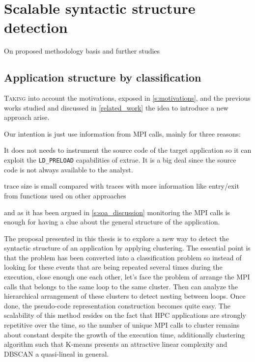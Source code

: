 
\chapter{Scalable syntactic structure detection}

On proposed methodology basis and further studies

\section{Application structure by
classification}\label{s:app_structire_by_classification}

\lettrine{T}{aking} into account the motivations, exposed in \ref{s:motivations}, and the
previous works studied and discussed in \ref{related_work} the idea to introduce
a new approach arise.
 
Our intention is just use information from MPI calls, mainly for 
three reasons:
\begin{enumerate*}[label=\roman*)]
  \item It does not needs to instrument the source code of the target
    application so it can exploit the \texttt{LD\_PRELOAD} capabilities of extrae.
    It is a big deal since the source code is not always available to the
    analyst.
  \item trace size is small compared with traces with more information
    like entry/exit from functions used on other approaches
  \item and as it has been argued in \ref{s:soa_discussion} monitoring the MPI 
    calls is enough for having a clue about the general structure of the 
    application.
\end{enumerate*}

The proposal presented in this thesis is to explore a new way to detect the
 syntactic structure of an application by applying clustering. 
The essential point is that the problem has been converted into a classification 
problem so instead of looking for these events that are being
repeated several times during the execution, close enough one each other, let's
face the problem of arrange the MPI calls that belongs to the same loop to the
same cluster. Then can analyze the hierarchical arrangement of these clusters to
detect nesting between loops. Once done, the pseudo-code representation 
construction becomes quite easy. The scalability of this method resides on the 
fact that HPC applications are strongly repetitive over the time, so the number 
of unique MPI calls to cluster remains about constant despite the growth of the 
execution time, additionally clustering algorithm such that K-means presents an 
attractive linear complexity and DBSCAN a quasi-lineal in general.

